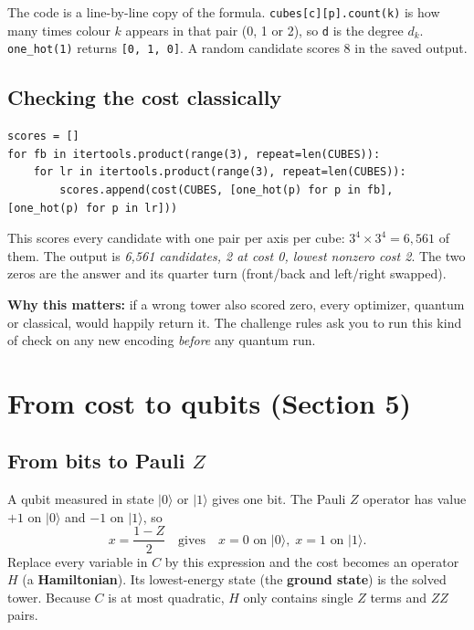 \documentclass[11pt]{article}
\newcommand{\code}[1]{\texttt{#1}}
\begin{document}
The code is a line-by-line copy of the formula. \code{cubes[c][p].count(k)} is
how many times colour $k$ appears in that pair (0, 1 or 2), so \code{d} is the
degree $d_k$. \code{one\_hot(1)} returns \code{[0, 1, 0]}. A random candidate
scores 8 in the saved output.

\subsection{Checking the cost classically}

\begin{lstlisting}
scores = []
for fb in itertools.product(range(3), repeat=len(CUBES)):
    for lr in itertools.product(range(3), repeat=len(CUBES)):
        scores.append(cost(CUBES, [one_hot(p) for p in fb], [one_hot(p) for p in lr]))
\end{lstlisting}

This scores every candidate with one pair per axis per cube:
$3^4 \times 3^4 = 6{,}561$ of them. The output is
\emph{6,561 candidates, 2 at cost 0, lowest nonzero cost 2}. The two zeros are
the answer and its quarter turn (front/back and left/right swapped).

\textbf{Why this matters:} if a wrong tower also scored zero, every optimizer,
quantum or classical, would happily return it. The challenge rules ask you to
run this kind of check on any new encoding \emph{before} any quantum run.

\section{From cost to qubits (Section 5)}

\subsection{\texorpdfstring{From bits to Pauli $Z$}{From bits to Pauli Z}}

A qubit measured in state $|0\rangle$ or $|1\rangle$ gives one bit. The Pauli
$Z$ operator has value $+1$ on $|0\rangle$ and $-1$ on $|1\rangle$, so
\[
x = \frac{1 - Z}{2}
\quad\text{gives}\quad x = 0 \text{ on } |0\rangle,\; x = 1 \text{ on } |1\rangle.
\]
Replace every variable in $C$ by this expression and the cost becomes an
operator $H$ (a \textbf{Hamiltonian}). Its lowest-energy state (the
\textbf{ground state}) is the solved tower. Because $C$ is at most quadratic,
$H$ only contains single $Z$ terms and $ZZ$ pairs.
\end{document}
